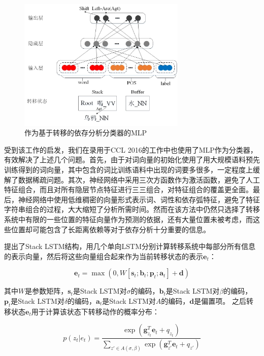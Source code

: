 \begin{figure}[hbtp]
	\centering
	\includegraphics[width=80mm]{picture/chen2014mlp.jpg}
	\caption{作为基于转移的依存分析分类器的MLP}
	\label{fig:chen2014mlp}
\end{figure}

受到该工作的启发，我们在录用于CCL 2016的工作中也使用了MLP作为分类器，有效解决了上述几个问题。首先，由于对词向量的初始化使用了用大规模语料预先训练得到的词向量，其中包含的词比训练语料中出现的词要多很多，一定程度上缓解了数据稀疏问题。其次，神经网络中采用三次方函数作为激活函数，避免了人工特征组合，而且对所有隐层节点特征进行三三组合，对特征组合的覆盖更全面。最后，神经网络中使用低维稠密的向量形式表示词、词性和依存弧特征，避免了特征字符串组合的过程，大大缩短了分析所需时间。然而在该方法中仍然只选择了转移系统中有限的一些位置的特征向量作为预测的依据，还有大量位置未被考虑，而这些位置却可能包含了长距离依赖等对于依存分析十分重要的信息。

提出了Stack LSTM结构，用几个单向LSTM分别计算转移系统中每部分所有信息的表示向量，然后将这些向量组合起来作为当前转移状态的表示$\mathbf{e}_t$：

\vspace{-0.6em}
\begin{equation}
\label{eq:trans}
\mathbf{e}_t=\max(0,W[\mathbf{s}_t;\mathbf{b}_t; \mathbf{p}_t; \mathbf{a}_t ]+\mathbf{d})
\end{equation}

其中$W$是参数矩阵，$\mathbf{s}_t$是Stack LSTM对$\sigma$的编码，$\mathbf{b}_t$是Stack LSTM对$\beta$的编码， $\mathbf{p}_t$是Stack LSTM对$\delta$的编码，$\mathbf{a}_t$是Stack LSTM对$A$的编码，$\mathbf{d}$是偏置项。
之后转移状态$\mathbf{e}_t$用于计算该状态下转移动作的概率分布：

\vspace{-0.6em}
\begin{equation}
p(z_t|e_t)=\frac{\exp(\mathbf{g}^T_{z_t}\mathbf{e}_t + q_{z_t})}{\sum_{z'\in A(\sigma, \beta)}\exp (\mathbf{g}^T_{z'}\mathbf{e}_t+q_{z'})}
\end{equation}

